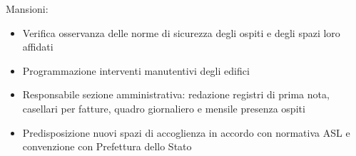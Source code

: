 \documentclass[12pt,a4paper,sans]{moderncv} %
\begin{document}
Mansioni:
\begin{itemize}
\item Verifica osservanza delle norme di sicurezza degli ospiti e degli spazi loro affidati
\item Programmazione interventi manutentivi degli edifici
\item Responsabile sezione amministrativa: redazione registri di prima nota, casellari per fatture, quadro giornaliero e mensile presenza ospiti
\item Predisposizione nuovi spazi di accoglienza in accordo con normativa ASL e convenzione con Prefettura dello Stato
\end{itemize}



%
%
%
%
\end{document}
